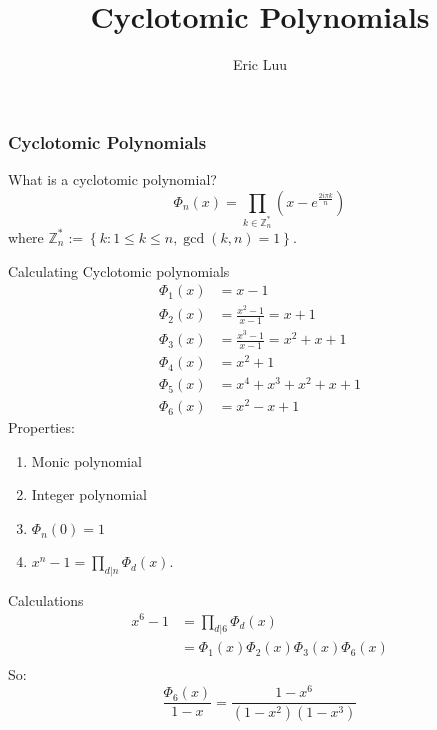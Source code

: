 \documentclass[]{beamer}
\title{Cyclotomic Polynomials}
\author{Eric Luu}
\begin{document}
\begin{frame}
\frametitle{Cyclotomic Polynomials}
\begin{block}{What is a cyclotomic polynomial?}
		\begin{equation}
		\Phi_n(x) = \prod_{k \in \mathbb{Z}_n^*}\left(x - e^{\frac{2 i \pi k}{n}}\right)
	\end{equation}
	where $\mathbb{Z}_n^* := \left\lbrace k : 1 \leq k \leq n, \gcd(k, n) = 1 \right\rbrace$. 
\end{block}

\end{frame}

\begin{frame}{Calculating Cyclotomic polynomials}
	\begin{align*}
		\Phi_1(x) &= x - 1\\
		\Phi_2(x) &= \frac{x^2 - 1}{x - 1} = x + 1\\
		\Phi_3(x) &= \frac{x^3 - 1}{x-1} = x^2 + x + 1\\
		\Phi_4(x) &= x^2 + 1\\
		\Phi_5(x) &= x^4 + x^3 + x^2 + x + 1\\
		\Phi_6(x) &= x^2 - x + 1
	\end{align*}
	Properties:
	\begin{enumerate}
		\item Monic polynomial
		\item Integer polynomial
		\item $\Phi_n(0) = 1$
		\item $x^n - 1 = \prod_{d|n} \Phi_d(x)$.
	\end{enumerate}
\end{frame}
\begin{frame}{Calculations}
	\begin{align*}
		x^6 - 1 &= \prod_{d | 6} \Phi_d(x)\\
		&= \Phi_1(x) \Phi_2(x) \Phi_3(x) \Phi_6(x)\\
	\end{align*}
	So:
	\begin{equation}
		\frac{\Phi_6(x)}{1-x} = \frac{1 - x^6}{(1 - x^2)(1 - x^3)}
	\end{equation}
\end{frame}
\end{document}
